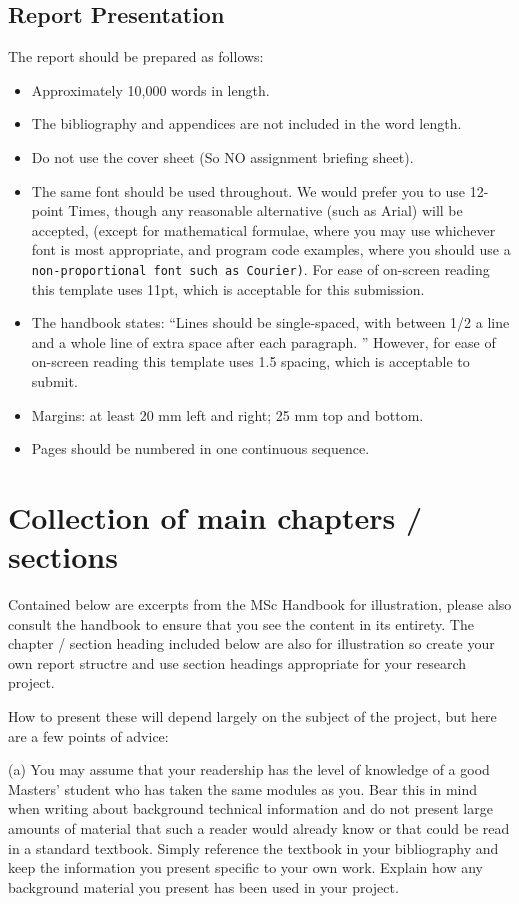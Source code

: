 \documentclass[a4paper, notitlepage, 11pt]{article}
\begin{document}
\subsection{Report Presentation}
The report should be prepared as follows:  
\begin{itemize}
\item Approximately 10,000 words in length.
\item The bibliography and appendices are not included in the word length.  
\item Do not use the cover sheet (So NO assignment briefing sheet).  
\item The same font should be used throughout. We would prefer you to use 12-point Times, 
though  any  reasonable  alternative  (such  as  Arial)  will  be  accepted,  (except  for 
mathematical  formulae,  where  you  may  use  whichever  font  is  most  appropriate,  and 
program  code  examples,  where  you  should  use  a  \texttt{non-proportional  font  such  as 
Courier)}.  For ease of on-screen reading this template uses 11pt, which is acceptable for this submission.
\item The handbook states: ``Lines should be single-spaced, with between 1/2 a line and a whole line of extra space after each paragraph. '' However, for ease of on-screen reading this template uses 1.5 spacing, which is acceptable to submit.
\item Margins: at least 20 mm left and right; 25 mm top and bottom.  
\item Pages should be numbered in one continuous sequence. 
\end{itemize}

\section{Collection of main chapters / sections}

Contained below are excerpts from the MSc Handbook for illustration, please also consult the handbook to ensure that you see the content in its entirety.  The chapter / section heading included below are also for illustration so create your own report structre and use section headings appropriate for your research project.

How to present these will depend largely on the subject of the project, but here are a few points of advice: 

(a) You  may  assume  that  your  readership  has  the  level  of  knowledge  of  a  good  Masters’ student  who  has  taken  the  same  modules  as  you.  Bear  this  in  mind  when  writing  about background  technical  information  and  do  not  present  large  amounts  of  material  that  such  a reader would already know or that could be read in a standard textbook. Simply reference the textbook in your bibliography and keep the information you present specific to your own work. Explain how any background material you present has been used in your project.  
\end{document}
